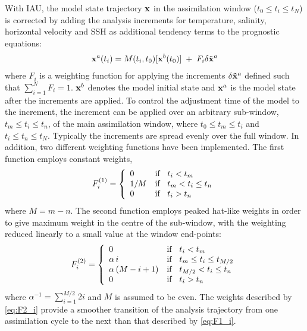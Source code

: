 \documentclass[../tex_main/NEMO_manual]{subfiles}
\begin{document}
With IAU, the model state trajectory ${\bf x}$ in the assimilation window ($t_{0} \leq t_{i} \leq t_{N}$)
is corrected by adding the analysis increments for temperature, salinity, horizontal velocity and SSH as
additional tendency terms to the prognostic equations:
\begin{eqnarray}     \label{eq:wa_traj_iau}
{\bf x}^{a}(t_{i}) = M(t_{i}, t_{0})[{\bf x}^{b}(t_{0})] 
\; + \; F_{i} \delta \tilde{\bf x}^{a} 
\end{eqnarray}
where $F_{i}$ is a weighting function for applying the increments $\delta\tilde{\bf x}^{a}$ defined such that
$\sum_{i=1}^{N} F_{i}=1$.
${\bf x}^b$ denotes the model initial state and ${\bf x}^a$ is the model state after the increments are applied.
To control the adjustment time of the model to the increment,
the increment can be applied over an arbitrary sub-window, $t_{m} \leq t_{i} \leq t_{n}$,
of the main assimilation window, where $t_{0} \leq t_{m} \leq t_{i}$ and $t_{i} \leq t_{n} \leq t_{N}$.
Typically the increments are spread evenly over the full window.
In addition, two different weighting functions have been implemented.
The first function employs constant weights, 
\begin{eqnarray}    \label{eq:F1_i}
F^{(1)}_{i}
=\left\{ \begin{array}{ll}
   0     &    {\rm if} \; \; \; t_{i} < t_{m}                \\
   1/M &    {\rm if} \; \; \; t_{m} < t_{i} \leq t_{n} \\
   0     &    {\rm if} \; \; \; t_{i} > t_{n}
  \end{array} \right. 
\end{eqnarray}
where $M = m-n$.
The second function employs peaked hat-like weights in order to give maximum weight in the centre of the sub-window,
with the weighting reduced linearly to a small value at the window end-points:
\begin{eqnarray}     \label{eq:F2_i}
F^{(2)}_{i}
=\left\{ \begin{array}{ll}
   0                           &    {\rm if} \; \; \; t_{i}       <     t_{m}                        \\
   \alpha \, i               &    {\rm if} \; \; \; t_{m}    \leq t_{i}    \leq   t_{M/2}   \\
   \alpha \, (M - i +1) &    {\rm if} \; \; \; t_{M/2}  <    t_{i}    \leq   t_{n}       \\
   0                            &   {\rm if} \; \; \; t_{i}        >    t_{n}
  \end{array} \right.
\end{eqnarray}
where $\alpha^{-1} = \sum_{i=1}^{M/2} 2i$ and $M$ is assumed to be even. 
The weights described by \autoref{eq:F2_i} provide a smoother transition of the analysis trajectory from
one assimilation cycle to the next than that described by \autoref{eq:F1_i}.
\end{document}
